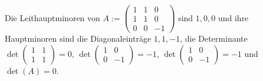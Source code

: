 \documentclass[../../main.tex]{subfiles}
\begin{document}
\begin{bsp}\label{14.2.10}
    Die Leithauptminoren von $A:=\begin{pmatrix*}1&1&0\\1&1&0\\ 0&0&-1\end{pmatrix*}$ sind $1,0,0$ und ihre Hauptminoren sind die Diagonaleinträge $1,1,-1$, die Determinante $\det\begin{pmatrix*}1&1\\1&1\end{pmatrix*}=0$, $\det\begin{pmatrix*}1&0\\0&-1\end{pmatrix*}=-1$, $\det\begin{pmatrix*}1&0\\0&-1\end{pmatrix*}=-1$ und $\det(A)=0$.
\end{bsp}
\end{document}
